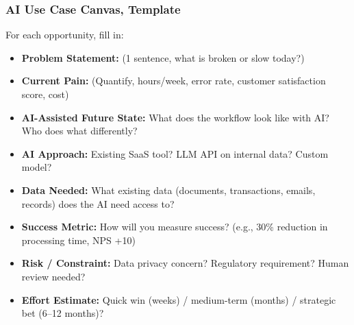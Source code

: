 \begin{frame}[fragile]\frametitle{AI Use Case Canvas, Template}

For each opportunity, fill in:
\begin{itemize}
  \item \textbf{Problem Statement:} (1 sentence, what is broken or slow today?)
  \item \textbf{Current Pain:} (Quantify, hours/week, error rate, customer satisfaction score, cost)
  \item \textbf{AI-Assisted Future State:} What does the workflow look like with AI? Who does what differently?
  \item \textbf{AI Approach:} Existing SaaS tool? LLM API on internal data? Custom model?
  \item \textbf{Data Needed:} What existing data (documents, transactions, emails, records) does the AI need access to?
  \item \textbf{Success Metric:} How will you measure success? (e.g., 30\% reduction in processing time, NPS +10)
  \item \textbf{Risk / Constraint:} Data privacy concern? Regulatory requirement? Human review needed?
  \item \textbf{Effort Estimate:} Quick win (weeks) / medium-term (months) / strategic bet (6--12 months)?
\end{itemize}

\end{frame}


